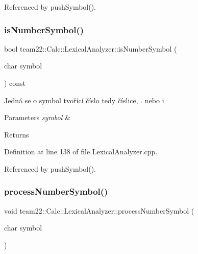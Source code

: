 Referenced by push\+Symbol().

\mbox{\label{classteam22_1_1_calc_1_1_lexical_analyzer_a922bf14131d064fce52bf126e8d29839}} 
\subsubsection{\texorpdfstring{is\+Number\+Symbol()}{isNumberSymbol()}}
{\footnotesize\ttfamily bool team22\+::\+Calc\+::\+Lexical\+Analyzer\+::is\+Number\+Symbol (\begin{DoxyParamCaption}\item[{char}]{symbol }\end{DoxyParamCaption}) const}

Jedná se o symbol tvořící číslo tedy číslice, . nebo i 
\begin{DoxyParams}{Parameters}
{\em symbol} & \\
\hline
\end{DoxyParams}
\begin{DoxyReturn}{Returns}

\end{DoxyReturn}


Definition at line 138 of file Lexical\+Analyzer.\+cpp.



Referenced by push\+Symbol().

\mbox{\label{classteam22_1_1_calc_1_1_lexical_analyzer_a18ba04d046da0b11eec66fb2689ddfef}} 
\subsubsection{\texorpdfstring{process\+Number\+Symbol()}{processNumberSymbol()}}
{\footnotesize\ttfamily void team22\+::\+Calc\+::\+Lexical\+Analyzer\+::process\+Number\+Symbol (\begin{DoxyParamCaption}\item[{char}]{symbol }\end{DoxyParamCaption})}

